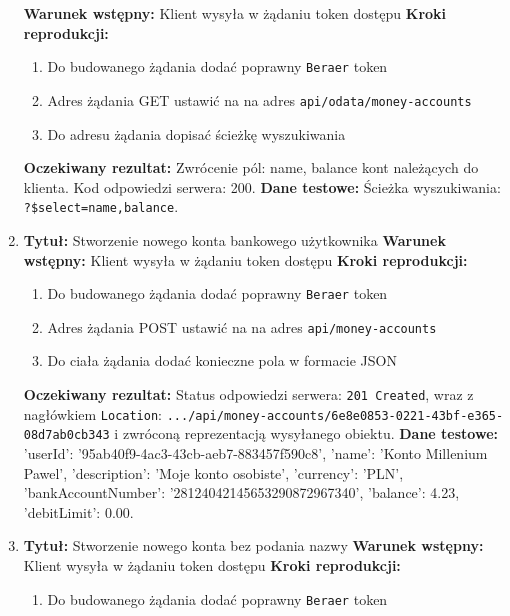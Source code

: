 \begin{enumerate}[labelwidth=1em,label=\Roman*]
    \textbf{Warunek wstępny:} Klient wysyła w żądaniu token dostępu \newline
    \textbf{Kroki reprodukcji:}  \begin{enumerate}[label=\arabic*.]
        \item Do budowanego żądania dodać poprawny \texttt{Beraer} token 
        \item Adres żądania GET ustawić na na adres \texttt{api/odata/money-accounts}
        \item Do adresu żądania dopisać ścieżkę wyszukiwania
    \end{enumerate}
    \textbf{Oczekiwany rezultat:}  Zwrócenie pól: name, balance kont należących do klienta. Kod odpowiedzi serwera: 200. \newline
    \textbf{Dane testowe:} Ścieżka wyszukiwania: \texttt{?\$select=name,balance}.
\item 
    \textbf{Tytuł:} Stworzenie nowego konta bankowego użytkownika \newline
    \textbf{Warunek wstępny:} Klient wysyła w żądaniu token dostępu \newline
    \textbf{Kroki reprodukcji:}  \begin{enumerate}[label=\arabic*.]
        \item Do budowanego żądania dodać poprawny \texttt{Beraer} token 
        \item Adres żądania POST ustawić na na adres \texttt{api/money-accounts}
        \item Do ciała żądania dodać konieczne pola w formacie JSON
    \end{enumerate}
    \textbf{Oczekiwany rezultat:}  Status odpowiedzi serwera: \texttt{201 Created}, wraz z nagłówkiem \texttt{Location}: \texttt{.../api/money-accounts/6e8e0853-0221-43bf-e365-08d7ab0cb343} i zwróconą reprezentacją wysyłanego obiektu. \newline
    \textbf{Dane testowe:} 'userId': '95ab40f9-4ac3-43cb-aeb7-883457f590c8', 'name': 'Konto Millenium Pawel', 'description': 'Moje konto osobiste', 'currency': 'PLN', 'bankAccountNumber': '28124042145653290872967340', 'balance': 4.23, 'debitLimit': 0.00.
\item 
    \textbf{Tytuł:} Stworzenie nowego konta bez podania nazwy \newline
    \textbf{Warunek wstępny:} Klient wysyła w żądaniu token dostępu \newline
    \textbf{Kroki reprodukcji:}  \begin{enumerate}[label=\arabic*.]
        \item Do budowanego żądania dodać poprawny \texttt{Beraer} token 

\end{enumerate}
\end{enumerate}
